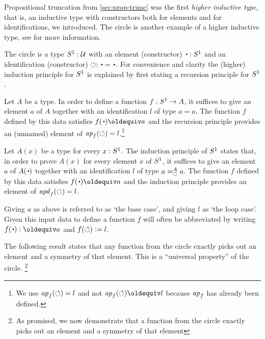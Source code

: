 Propositional truncation from \cref{sec:prop-trunc} was
the first \emph{higher inductive type}, that is, an inductive type
with constructors both for elements and for identifications,
we introduced. 
The circle is another example of a higher inductive type,
see \cite[Ch. 6]{hottbook} for more information.

\begin{definition}
  \label{def:circle}
The circle is a type ${S^1}:\mathcal{U}$ with an element (constructor) $\base : \Sc$ and 
an identification (constructor) $\Sloop: \base=\base$. For convenience and
clarity the (higher) induction principle for ${S^1}$ is explained
by first stating a recursion principle for ${S^1}$.

Let $A$ be a type. In order to define a function $f:{S^1}\to A$,
it suffices to give an element $a$ of $A$ together with an
identification $l$ of type $a=a$. The function $f$ defined
by this data satisfies $f(\base)\jdeq a$ and 
the recursion principle provides an (unnamed) element of 
$\mathop{{\it ap}_{f}}(\circlearrowleft)=l$.\footnote{%
We use $\mathop{{\it ap}_{f}}(\circlearrowleft)=l$ and not $\ap{f}(\Sloop)\jdeq l$ because
$\mathop{{\it ap}_{f}}$ has already been defined.}

Let $A(x)$ be a type for every $x:{S^1}$. The induction principle of ${S^1}$
states that, in order to prove $A(x)$ for every element $x$ of ${S^1}$,
it suffices to give an element $a$ of $A(\base)$ together with an
identification $l$ of type $a =^{A}_{\circlearrowleft} a$. 
The function $f$ defined by this data satisfies $f(\base)\jdeq a$ and 
the induction principle provides an element of $\mathop{{\it apd}_{f}}(\circlearrowleft)=l$.
\end{definition}

Giving $a$ as above is referred to as `the base case', and
giving $l$ as `the loop case'. Given this input data to define
a function $f$ will often be abbreviated by writing
$f(\base)\defeq a$ and $f(\circlearrowleft)\vcentcolon= l$.

The following result states that any function from the circle exactly 
picks out an element and a symmetry of that element.
This is a ``universal property'' of the circle.
\footnote{\color{blue}As promised, we now demonstrate that a function from the circle exactly 
picks out an element and a symmetry of that element}

